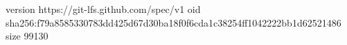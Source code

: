 version https://git-lfs.github.com/spec/v1
oid sha256:f79a8585330783dd425d67d30ba18f0f6cda1c38254ff1042222bb1d62521486
size 99130
